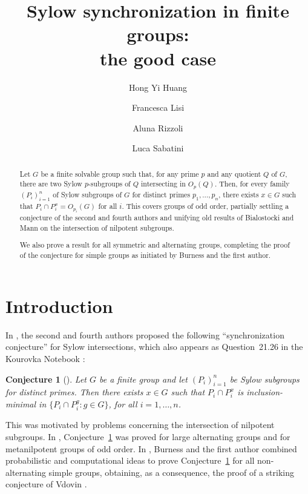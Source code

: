 \documentclass[11pt]{amsart}
\author[Hong Yi Huang]{Hong Yi Huang}
\author[Francesca Lisi]{Francesca Lisi}
\author[Aluna Rizzoli]{Aluna Rizzoli}
\author[Luca Sabatini]{Luca Sabatini}
\title[Sylow synchronization in finite groups]{Sylow synchronization in finite groups:\\the good case}
\numberwithin{equation}{section}
\newtheorem{conjecture}{Conjecture}
\theoremstyle{definition}
\theoremstyle{remark}
\begin{document}
 

\maketitle 

\begin{abstract} 
Let $G$ be a finite solvable group such that,
for any prime $p$ and any quotient $Q$ of $G$,
there are two Sylow $p$-subgroups of $Q$ intersecting in $O_p(Q)$.
Then, for every family $(P_i)_{i=1}^n$ of Sylow subgroups of $G$ for distinct primes $p_1,\ldots,p_n$, there exists $x \in G$ such that $P_i \cap P_i^x = O_{p_i}(G)$ for all $i$.
This covers groups of odd order,
partially settling a conjecture of the second and fourth authors
and unifying old results of Bialostocki and Mann on the intersection of nilpotent subgroups.

We also prove a result for all symmetric and alternating groups,
completing the proof of the conjecture for simple groups
as initiated by Burness and the first author.
\end{abstract}


\vspace{0.2cm}
\section{Introduction} \label{sec1}

In \cite{LS26}, the second and fourth authors proposed
the following ``synchronization conjecture'' for Sylow intersections,
which also appears as Question~21.26 in the Kourovka Notebook \cite{Kou26}: 

\begin{conjecture}[\cite{LS26}] \label{conjMain}
Let $G$ be a finite group and let $(P_i)_{i=1}^n$ be Sylow subgroups for distinct primes.
Then there exists $x \in G$ such that $P_i \cap P_i^x$ is inclusion-minimal in $\{ P_i \cap P_i^g : g \in G\}$,
for all $i=1,\ldots,n$.
\end{conjecture}

This was motivated by problems concerning the intersection of nilpotent subgroups.
In \cite{LS26}, Conjecture~\ref{conjMain} was proved
for large alternating groups and for metanilpotent groups of odd order.
In \cite{BH26}, Burness and the first author combined probabilistic and computational ideas
to prove Conjecture~\ref{conjMain} for all non-alternating simple groups,
obtaining, as a consequence,
the proof of a striking conjecture of Vdovin \cite[Question~15.40]{Kou26}.
\end{document}
